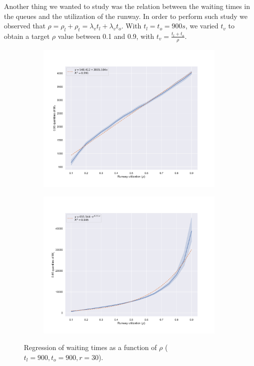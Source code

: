 \documentclass[12pt]{article}
\begin{document}
Another thing we wanted to study was the relation between the waiting times in the queues and the utilization of the runway. In order to perform such study we observed that $ \rho = \rho_l + \rho_t = \lambda_v t_l + \lambda_v t_o $. With $ t_l = t_o = 900 s $, we varied $t_v $ to obtain a target $\rho$ value between 0.1 and 0.9, with $ t_v = \tfrac{t_l + t_o}{\rho} $.

\begin{figure}[H]
	\centering
	\begin{subfigure}[b]{.49\linewidth}
		\includegraphics[width=\linewidth]{report/immagini/rho_wt.pdf}
		\caption{}
		\label{rho-wt}
	\end{subfigure}
	\begin{subfigure}[b]{.49\linewidth}
		\includegraphics[width=\linewidth]{report/immagini/rho_wl.pdf}
		\caption{}
		\label{rho-wl}
	\end{subfigure}
	\caption{Regression of waiting times as a function of $\rho$ ($t_l = 900, t_o = 900, r = 30$).}
	\label{rho-queues}
\end{figure}
\end{document}
